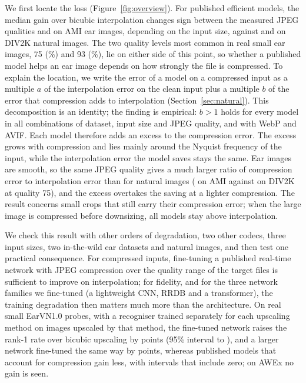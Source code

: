 We first locate the loss (Figure~\ref{fig:overview}). For \NPub{} published efficient models, the median gain over bicubic interpolation changes sign between the measured JPEG qualities \CrossGridAmiLo{} and \CrossGridAmiHi{} on AMI ear images, depending on the input size, against \CrossGridNatLo{} and \CrossGridNatHi{} on DIV2K natural images. The two quality levels most common in real small ear images, 75 (\QLowShare{}\%) and 93 (\QHighShare{}\%), lie on either side of this point, so whether a published model helps an ear image depends on how strongly the file is compressed. To explain the location, we write the error of a model on a compressed input as a multiple $a$ of the interpolation error on the clean input plus a multiple $b$ of the error that compression adds to interpolation (Section~\ref{sec:natural}). This decomposition is an identity; the finding is empirical: $b>1$ holds for every model in all \RatioCells{} combinations of dataset, input size and JPEG quality, and with WebP and AVIF. Each model therefore adds an excess to the compression error. The excess grows with compression and lies mainly around the Nyquist frequency of the input, while the interpolation error the model saves stays the same. Ear images are smooth, so the same JPEG quality gives a much larger ratio of compression error to interpolation error than for natural images (\RatioAmiQLow{} on AMI against \RatioDivQLow{} on DIV2K at quality 75), and the excess overtakes the saving at a lighter compression. The result concerns small crops that still carry their compression error; when the large image is compressed before downsizing, all models stay above interpolation.

We check this result with other orders of degradation, two other codecs, three input sizes, two in-the-wild ear datasets and natural images, and then test one practical consequence. For compressed inputs, fine-tuning a published real-time network with JPEG compression over the quality range of the target files is sufficient to improve on interpolation; for fidelity, and for the three network families we fine-tuned (a lightweight CNN, RRDB and a transformer), the training degradation then matters much more than the architecture. On real small EarVN1.0 probes, with a recogniser trained separately for each upscaling method on images upscaled by that method, the fine-tuned network raises the rank-1 rate over bicubic upscaling by \RecUpEarvnGain{} points (95\% interval \RecUpEarvnGainLo{} to \RecUpEarvnGainHi{}), and a larger network fine-tuned the same way by \RecAllEarvnRrdbGain{} points, whereas published models that account for compression gain less, with intervals that include zero; on AWEx no gain is seen.

